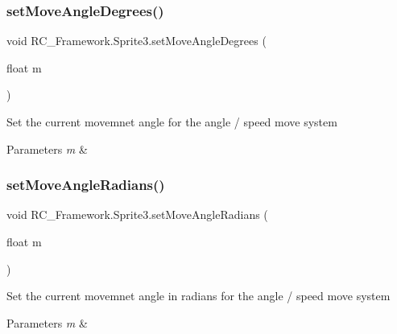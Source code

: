 \subsubsection{\texorpdfstring{set\+Move\+Angle\+Degrees()}{setMoveAngleDegrees()}}
{\footnotesize\ttfamily void R\+C\+\_\+\+Framework.\+Sprite3.\+set\+Move\+Angle\+Degrees (\begin{DoxyParamCaption}\item[{float}]{m }\end{DoxyParamCaption})}



Set the current movemnet angle for the angle / speed move system 


\begin{DoxyParams}{Parameters}
{\em m} & \\
\hline
\end{DoxyParams}
\mbox{\label{class_r_c___framework_1_1_sprite3_a323f04ef41bc129dee67fa3b4a5cab42}} 
\subsubsection{\texorpdfstring{set\+Move\+Angle\+Radians()}{setMoveAngleRadians()}}
{\footnotesize\ttfamily void R\+C\+\_\+\+Framework.\+Sprite3.\+set\+Move\+Angle\+Radians (\begin{DoxyParamCaption}\item[{float}]{m }\end{DoxyParamCaption})}



Set the current movemnet angle in radians for the angle / speed move system 


\begin{DoxyParams}{Parameters}
{\em m} & \\
\hline
\end{DoxyParams}
\mbox{\label{class_r_c___framework_1_1_sprite3_a630b8d8f2eda0fc820bf76a2c65f0671}} 

